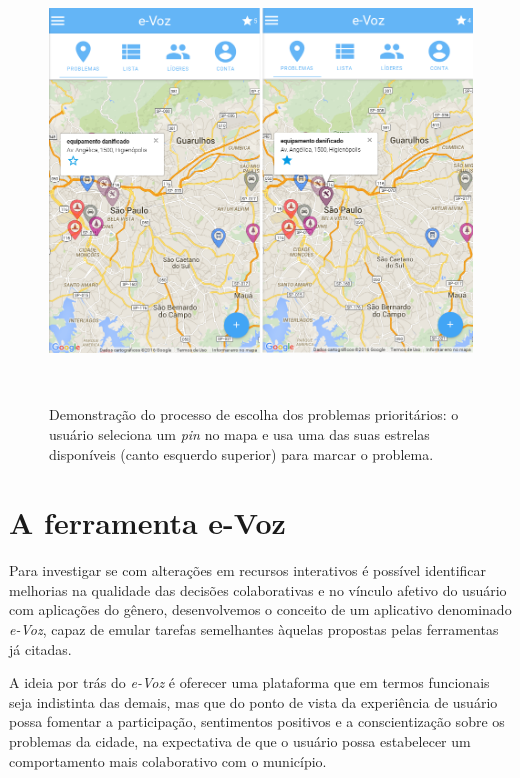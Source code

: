 \documentclass{sigchi}
\begin{document}
\begin{figure}
	\centering
	\includegraphics[width=0.85\columnwidth]{figures/prototipo1a}
	\caption{Demonstração do processo de escolha dos problemas prioritários: o usuário seleciona um \textit{pin} no mapa e usa uma das suas estrelas disponíveis (canto esquerdo superior) para marcar o problema. }~\label{fig:figure1}
\end{figure}

\section{A ferramenta e-Voz}
Para investigar se com alterações em recursos interativos é possível identificar melhorias na qualidade das decisões colaborativas e no vínculo afetivo do usuário com aplicações do gênero, desenvolvemos o conceito de um aplicativo denominado \textit{e-Voz}, capaz de emular tarefas semelhantes àquelas propostas pelas ferramentas já citadas.

A ideia por trás do \textit{e-Voz} é oferecer uma plataforma que em termos funcionais seja indistinta das demais, mas que do ponto de vista da experiência de usuário possa fomentar a participação, sentimentos positivos e a conscientização sobre os problemas da cidade, na expectativa de que o usuário possa estabelecer um comportamento mais colaborativo com o município.
\end{document}
